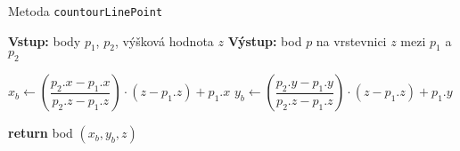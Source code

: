 \begin{algorithm}
    \caption{Metoda \texttt{countourLinePoint}}
    \begin{algorithmic}[1]
        \STATE \textbf{Vstup:} body $p_1$, $p_2$, výšková hodnota $z$
        \STATE \textbf{Výstup:} bod $p$ na vrstevnici $z$ mezi $p_1$ a $p_2$

        \STATE $x_b \gets \left(\dfrac{p_2.x - p_1.x}{p_2.z - p_1.z}\right) \cdot (z - p_1.z) + p_1.x$
        \STATE $y_b \gets \left(\dfrac{p_2.y - p_1.y}{p_2.z - p_1.z}\right) \cdot (z - p_1.z) + p_1.y$

        \STATE \textbf{return} bod $(x_b, y_b, z)$
    \end{algorithmic}
\end{algorithm}
